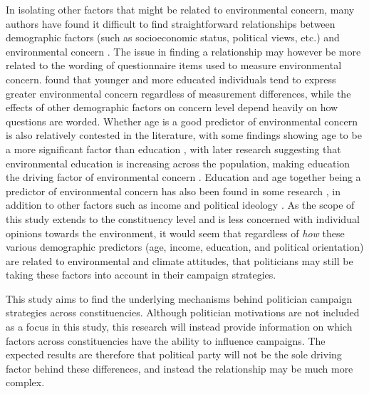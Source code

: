 \documentclass[preprint]{elsarticle} %
\begin{document}
In isolating other factors that might be related to environmental concern, many authors have found it difficult to find straightforward relationships between demographic factors (such as socioeconomic status, political views, etc.) and environmental concern \citep{dietzSocialStructuralSocial1998,samdahlSocialDeterminantsEnvironmental1989,giffordPersonalSocialFactors2014}. The issue in finding a relationship may however be more related to the wording of questionnaire items used to measure environmental concern. \citet{klinebergDemographicPredictorsEnvironmental1998} found that younger and more educated individuals tend to express greater environmental concern regardless of measurement differences, while the effects of other demographic factors on concern level depend heavily on how questions are worded. Whether age is a good predictor of environmental concern is also relatively contested in the literature, with some findings showing age to be a more significant factor than education \citep{buttelAgeEnvironmentalConcern1979}, with later research suggesting that environmental education is increasing across the population, making education the driving factor of environmental concern \citep{howellChangingFaceEnvironmental1992}. Education and age together being a predictor of environmental concern has also been found in some research \citep{arcuryEnvironmentalWorldviewResponse1990}, in addition to other factors such as income \citep{gambaFactorsInfluencingCommunity1994} and political ideology \citep{dunlapImpactPoliticalOrientation1975}. As the scope of this study extends to the constituency level and is less concerned with individual opinions towards the environment, it would seem that regardless of \textit{how} these various demographic predictors (age, income, education, and political orientation) are related to environmental and climate attitudes, that politicians may still be taking these factors into account in their campaign strategies.

This study aims to find the underlying mechanisms behind politician campaign strategies across constituencies. Although politician motivations are not included as a focus in this study, this research will instead provide information on which factors across constituencies have the ability to influence campaigns. The expected results are therefore that political party will not be the sole driving factor behind these differences, and instead the relationship may be much more complex. 
	
	
	\newpage
	
\end{document}
